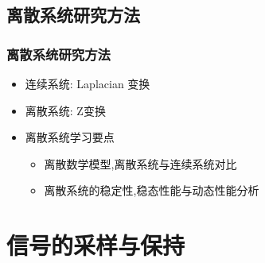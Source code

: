 \documentclass[table]{article}
\begin{document}
\subsection{离散系统研究方法}
\label{sec-1-4}
\begin{frame}
\frametitle{离散系统研究方法}
\label{sec-1-4-1}

\begin{itemize}
\item 连续系统: Laplacian 变换
\item <2->离散系统: Z变换
\item <3->离散系统学习要点
\begin{itemize}
\item <4->离散数学模型,离散系统与连续系统对比
\item <5->离散系统的稳定性,稳态性能与动态性能分析
\end{itemize}
\end{itemize}
\end{frame}
\section{信号的采样与保持}
\label{sec-2}
\end{document}
